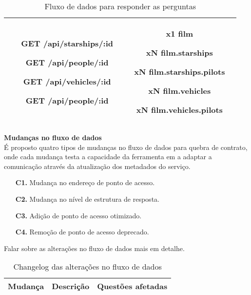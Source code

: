 \begin{table}[H]
\begin{tabular}{|c|c|c|}
\begin{minipage}[t]{0.4\textwidth}
\begin{itemize}
        \item[\textbf{GET}] /api/starships/:id
        \item[\textbf{GET}] /api/people/:id
        \item[\textbf{GET}] /api/vehicles/:id
        \item[\textbf{GET}] /api/people/:id
      \end{itemize}
    \end{minipage} & \begin{minipage}[t]{0.4\textwidth}
      \begin{itemize}
        \item[\textbf{x1}] film
        \item[\textbf{xN}] film.starships
        \item[\textbf{xN}] film.starships.pilots
        \item[\textbf{xN}] film.vehicles
        \item[\textbf{xN}] film.vehicles.pilots
      \end{itemize}
    \end{minipage} \\
    \hline
  \end{tabular}
  \caption{Fluxo de dados para responder as perguntas}
\end{table}

\textbf{Mudanças no fluxo de dados} \\

É proposto quatro tipos de mudanças no fluxo de dados para quebra de contrato, onde cada mudança testa a capacidade da ferramenta em a adaptar a comunicação através da atualização dos metadados do serviço. \\

\begin{enumerate}
\item[\textbf{C1.}] Mudança no endereço de ponto de acesso.
\item[\textbf{C2.}] Mudança no nível de estrutura de resposta.
\item[\textbf{C3.}] Adição de ponto de acesso otimizado.
\item[\textbf{C4.}] Remoção de ponto de acesso deprecado.
\end{enumerate}

Falar sobre as alterações no fluxo de dados mais em detalhe.

\begin{table}[H]
  \centering
  \begin{tabular}{|c|c|c|}
    \hline
    Mudança & Descrição & Questões afetadas \\
    \hline
  \end{tabular}
  \caption{Changelog das alterações no fluxo de dados}
\end{table}

